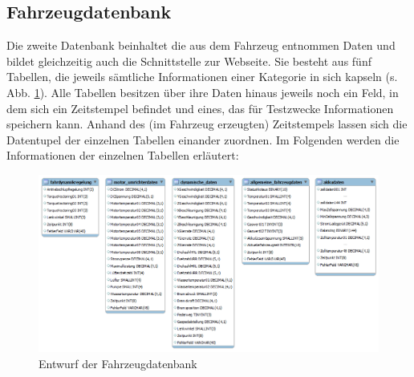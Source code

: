 \documentclass[fontsize = 12pt, paper = a4]{scrreprt}
\begin{document}
\subsection{Fahrzeugdatenbank}

Die zweite Datenbank beinhaltet die aus dem Fahrzeug entnommen Daten und bildet gleichzeitig auch die Schnittstelle zur Webseite. Sie besteht aus fünf Tabellen, die jeweils sämtliche Informationen einer Kategorie in sich kapseln (s. Abb. \ref{Fahrzeugdatenbank}). Alle Tabellen besitzen über ihre Daten hinaus jeweils noch ein Feld, in dem sich ein Zeitstempel befindet und eines, das für Testzwecke Informationen speichern kann. Anhand des (im Fahrzeug erzeugten) Zeitstempels lassen sich die Datentupel der einzelnen Tabellen einander zuordnen. Im Folgenden werden die Informationen der einzelnen Tabellen erläutert:

\begin{figure}[h]
\centering
\includegraphics[scale = 0.43]{fahrzeugdatenbank} %
\caption[Entwurf Fahrzeugdatenbank]{Entwurf der Fahrzeugdatenbank}
\label{Fahrzeugdatenbank}
\end{figure} 
\end{document}
